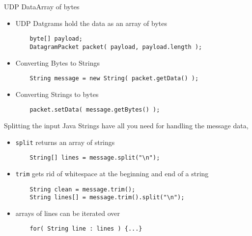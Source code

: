 \documentclass[xcolor=svgnames]{beamer}
\begin{document}
\begin{frame}[fragile]{UDP Data}{Array of bytes}
    \begin{itemize}
        \item UDP Datgrams hold the data as an array of bytes
\begin{verbatim}
    byte[] payload;
    DatagramPacket packet( payload, payload.length );
\end{verbatim}

\item Converting Bytes to Strings
\begin{verbatim}
    String message = new String( packet.getData() );
\end{verbatim}

\item Converting Strings to bytes
\begin{verbatim}
    packet.setData( message.getBytes() );
\end{verbatim}

\end{itemize}
\end{frame}

\begin{frame}[fragile]{Splitting the input}
Java Strings have all you need for handling the message data,
\begin{itemize}
    \item \texttt{split} returns an array of strings
\begin{verbatim}
    String[] lines = message.split("\n");
\end{verbatim}

\item \texttt{trim} gets rid of whitespace at the beginning and end of a string
\begin{verbatim}
    String clean = message.trim();
    String lines[] = message.trim().split("\n");
\end{verbatim}

\item arrays of lines can be iterated over
\begin{verbatim}
    for( String line : lines ) {...}
\end{verbatim}

\end{itemize}
\end{frame}
\end{document}
